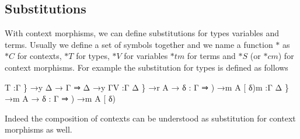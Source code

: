 \documentclass{acm_proc_article-sp}
\begin{document}


\subsection{Substitutions}

With context morphisms, we can define substitutions for types
variables and terms.  Usually we define a set of symbols together and
we name a function $*$ as $*C$ for contexts, $*T$ for types, $*V$ for
variables $*tm$ for terms and $*S$ (or $*cm$) for context morphisms. For example
the substitution for types is defined as follows

\begin{code}%
\>\AgdaFunction{
\_[\_]}T   :\AgdaBound{\{}Γ \} →y Δ → Γ ⇒ Δ →y Γ\AgdaFunction{
\_[\_]}V   :\AgdaBound{\{}Γ Δ \} →r A → \AgdaBound{(}δ : Γ ⇒ ) →m \AgdaBound{(}A [ δ\AgdaFunction{ ]})m  :\AgdaBound{\{}Γ Δ \} →m A → \AgdaBound{(}δ : Γ ⇒ ) →m \AgdaBound{(}A [ δ\AgdaFunction{ ]})    
\<%
\end{code}
Indeed the
composition of contexts can be understood as substitution for context morphisms as well.
\end{document}
